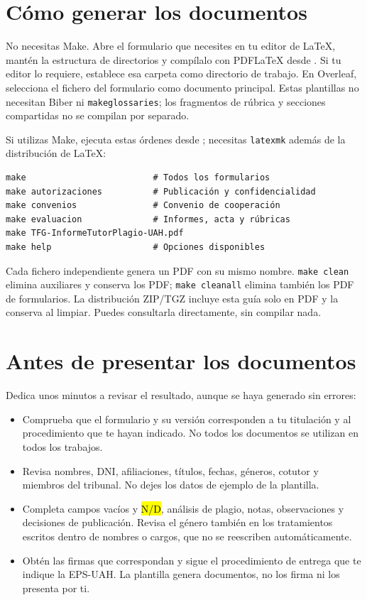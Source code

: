 \documentclass[10pt,a4paper]{article}
\newcommand{\fichero}[1]{\path{#1}}
\begin{document}
\medskip
\begin{minipage}{\linewidth}
\setlength{\parskip}{4pt}
\section{Cómo generar los documentos}

No necesitas Make. Abre el formulario que necesites en tu editor de LaTeX, mantén la estructura de directorios y compílalo con PDFLaTeX desde \fichero{PapeleoTFG/}. Si tu editor lo requiere, establece esa carpeta como directorio de trabajo. En Overleaf, selecciona el fichero del formulario como documento principal. Estas plantillas no necesitan Biber ni \texttt{makeglossaries}; los fragmentos de rúbrica y secciones compartidas no se compilan por separado.

Si utilizas Make, ejecuta estas órdenes desde \fichero{PapeleoTFG/}; necesitas \texttt{latexmk} además de la distribución de LaTeX:

\medskip
\begin{minipage}{\linewidth}
\begin{verbatim}
make                         # Todos los formularios
make autorizaciones          # Publicación y confidencialidad
make convenios               # Convenio de cooperación
make evaluacion              # Informes, acta y rúbricas
make TFG-InformeTutorPlagio-UAH.pdf
make help                    # Opciones disponibles
\end{verbatim}
\end{minipage}
Cada fichero independiente genera un PDF con su mismo nombre. \texttt{make clean} elimina auxiliares y conserva los PDF; \texttt{make cleanall} elimina también los PDF de formularios. La distribución ZIP/TGZ incluye esta guía solo en PDF y la conserva al limpiar. Puedes consultarla directamente, sin compilar nada.

\section{Antes de presentar los documentos}

Dedica unos minutos a revisar el resultado, aunque se haya generado sin errores:
\begin{itemize}
  \item Comprueba que el formulario y su versión corresponden a tu titulación y al procedimiento que te hayan indicado. No todos los documentos se utilizan en todos los trabajos.
  \item Revisa nombres, DNI, afiliaciones, títulos, fechas, géneros, cotutor y miembros del tribunal. No dejes los datos de ejemplo de la plantilla.
  \item Completa campos vacíos y \hl{N/D}, análisis de plagio, notas, observaciones y decisiones de publicación. Revisa el género también en los tratamientos escritos dentro de nombres o cargos, que no se reescriben automáticamente.
  \item Obtén las firmas que correspondan y sigue el procedimiento de entrega que te indique la EPS-UAH. La plantilla genera documentos, no los firma ni los presenta por ti.
\end{itemize}
\end{minipage}
\end{document}

